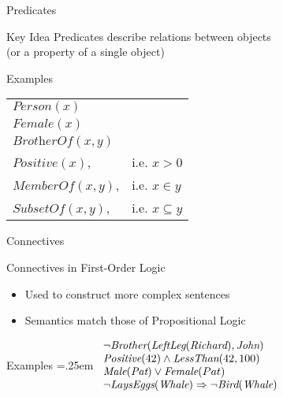 \documentclass[14pt]{beamer}
\begin{document}
\begin{frame}{Predicates}
	\begin{block}{Key Idea}
		\alert{Predicates} describe relations between objects \\
		\tab(or a property of a single object)
	\end{block}
	\begin{block}{Examples}
		\begin{tabular}{ll}
			$\textit{Person}(x)$ \\
			$\textit{Female}(x)$ \\
			$\textit{BrotherOf}(x, y)$ \\
			$\textit{Positive}(x)$,     & i.e. $x > 0$ \\
			$\textit{MemberOf}(x, y)$,  & i.e. $x \in y$ \\
			$\textit{SubsetOf}(x, y)$,  & i.e. $x \subseteq y$ \\
		\end{tabular}
	\end{block}
\end{frame}
\begin{frame}{Connectives}
	\begin{block}{Connectives in First-Order Logic}
		\begin{itemize}
			\item Used to construct more complex sentences
			\item Semantics match those of Propositional Logic
		\end{itemize}
	\end{block}
	\begin{block}{Examples}
		\extrarowheight=.25em 
		$
		\begin{array}{ll}
			\lnot\textit{Brother}(\textit{LeftLeg}(\textit{Richard}), \textit{John}) \\
			\textit{Positive}(42) \land \textit{LessThan}(42, 100) \\
			\textit{Male}(\textit{Pat}) \lor \textit{Female}(Pat) \\
			\lnot\textit{LaysEggs}(\textit{Whale}) \Rightarrow \lnot\textit{Bird}(\textit{Whale})
		\end{array}
		$
	\end{block}
\end{frame}
\end{document}
